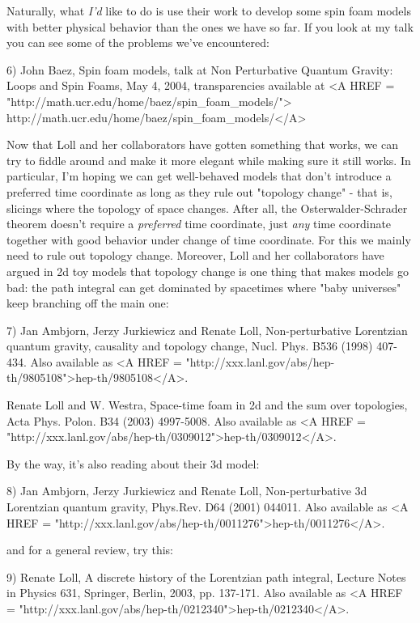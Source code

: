 Naturally, what \emph{I'd} like to do is use their work to develop some spin
foam models with better physical behavior than the ones we have so far.  
If you look at my talk you can see some of the problems we've encountered:

6) John Baez, Spin foam models, talk at Non Perturbative Quantum Gravity: 
Loops and Spin Foams, May 4, 2004, transparencies available at
<A HREF = "http://math.ucr.edu/home/baez/spin_foam_models/">
http://math.ucr.edu/home/baez/spin_foam_models/</A>

Now that Loll and her collaborators have gotten something that works, 
we can try to fiddle around and make it more elegant while making sure it
still works.  In particular, I'm hoping we can get well-behaved models 
that don't introduce a preferred time coordinate as long as they rule out 
"topology change" - that is, slicings where the topology of space 
changes.
After all, the Osterwalder-Schrader theorem doesn't require a \emph{preferred}
time coordinate, just \emph{any} time coordinate together with good behavior 
under change of time coordinate.  For this we mainly need to rule out 
topology change.  Moreover, Loll and her collaborators have argued in 2d 
toy models that topology change is one thing that makes models go bad: the 
path integral can get dominated by spacetimes where "baby universes" 
keep branching off the main one:

7) Jan Ambjorn, Jerzy Jurkiewicz and Renate Loll, Non-perturbative 
Lorentzian quantum gravity, causality and topology change, Nucl. Phys. 
B536 (1998) 407-434.  Also available as <A HREF = "http://xxx.lanl.gov/abs/hep-th/9805108">hep-th/9805108</A>.

Renate Loll and W. Westra, Space-time foam in 2d and the sum over 
topologies, Acta Phys. Polon. B34 (2003) 4997-5008.  Also available as
<A HREF = "http://xxx.lanl.gov/abs/hep-th/0309012">hep-th/0309012</A>.

By the way, it's also reading about their 3d model:

8) Jan Ambjorn, Jerzy Jurkiewicz and Renate Loll, Non-perturbative 3d 
Lorentzian quantum gravity, Phys.Rev. D64 (2001) 044011.  Also available
as <A HREF = "http://xxx.lanl.gov/abs/hep-th/0011276">hep-th/0011276</A>.

and for a general review, try this:
 
9) Renate Loll, A discrete history of the Lorentzian path integral,
Lecture Notes in Physics 631, Springer, Berlin, 2003, pp. 137-171.
Also available as 
<A HREF = "http://xxx.lanl.gov/abs/hep-th/0212340">hep-th/0212340</A>.

